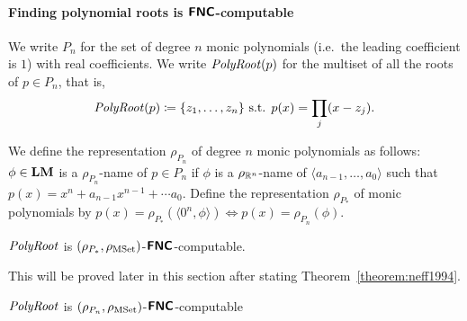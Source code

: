 \documentclass[envcountsame,orivec,oribibl]{llncs}
\begin{document}
\paragraph{Finding polynomial roots is $\text{\bfseries \sffamily \upshape FNC}$-computable}

We write $P_n$ for the set of degree $n$ monic 
polynomials (i.e.\ the leading coefficient is $1$) with real coefficients.
We write $\mathit{PolyRoot}(p)$ for the multiset of all the roots of $p \in P_n$, that is,
\begin{equation}
 \mathit{PolyRoot}(p) \coloneqq \{ z_1, \dots, z_n \} \text{ s.t. } p(x) = \prod_j (x - z_j).
\end{equation}

We define the representation $\rho_{P_n}$ of degree $n$ monic polynomials as follows: 
$\phi \in \mathbf{LM}$ is a $\rho_{P_n}$-name of $p \in P_n$ 
if $\phi$ is a $\rho_{\mathbb R^n}$-name of $\langle a_{n-1}, \dots, a_0 \rangle$ 
such that $p(x) = x^n + a_{n-1}x^{n-1} + \cdots a_0$.
Define the representation $\rho_{P_*}$ of monic polynomials by
$p(x) = \rho_{P_*}(\langle 0^n, \phi \rangle) \iff p(x) = \rho_{P_n}(\phi)$.


\begin{theorem}
 \label{theorem:finding-roots-is-in-NC}
 $\mathit{PolyRoot}$ is $(\rho_{P_*}, \rho_{\mathrm{MSet}})$-$\text{\bfseries \sffamily \upshape FNC}$-computable.
\end{theorem}

This will be proved later in this section
after stating Theorem~\ref{theorem:neff1994}. 

\begin{corollary}
 $\mathit{PolyRoot}$ is $(\rho_{P_n}, \rho_{\mathrm{MSet}})$-$\text{\bfseries \sffamily \upshape FNC}$-computable
\end{corollary}
\end{document}
